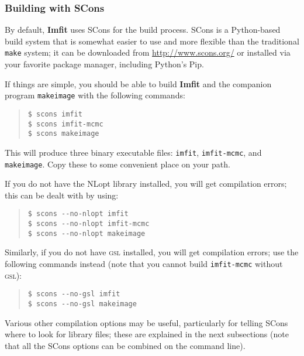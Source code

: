 \documentclass[10pt,a4paper,article]{memoir}
\newcommand{\imfit}{\textbf{Imfit}}
\newcommand{\imfitprog}{\texttt{imfit}}
\newcommand{\imfitmcmc}{\texttt{imfit-mcmc}}
\newcommand{\makeimage}{\texttt{makeimage}}
\begin{document}
\subsubsection{Building with SCons}

By default, \imfit{} uses SCons for the build process. SCons is a Python-based build system
that is somewhat easier to use and more flexible than the traditional \texttt{make}
system; it can be downloaded from \url{http://www.scons.org/} or installed via
your favorite package manager, including Python's Pip.

If things are simple, you should be able to build \imfit{} and the companion
program \makeimage{} with the following commands:
\begin{quote}
\texttt{\$ scons imfit} \\
\texttt{\$ scons imfit-mcmc} \\
\texttt{\$ scons makeimage}
\end{quote}
This will produce three binary executable files: \imfitprog, \imfitmcmc, and \makeimage{}. Copy
these to some convenient place on your path.

If you do not have the NLopt library installed, you will get compilation errors;
this can be dealt with by using:
\begin{quote}
\verb+$ scons --no-nlopt imfit+ \\
\verb+$ scons --no-nlopt imfit-mcmc+ \\
\verb+$ scons --no-nlopt makeimage+
\end{quote}

Similarly, if you do not have \textsc{gsl} installed, you will get compilation errors; use the following
commands instead (note that you cannot build \imfitmcmc{} without \textsc{gsl}):
\begin{quote}
\verb+$ scons --no-gsl imfit+ \\
\verb+$ scons --no-gsl makeimage+
\end{quote}

Various other compilation options may be useful, particularly for telling SCons where
to look for library files; these are explained in the next
subsections (note that all the SCons options can be combined on the command
line).


%
%
\end{document}

